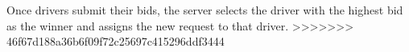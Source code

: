 \begin{algorithm}
\begin{algorithmic}[1]
Once drivers submit their bids, the server selects the driver with the highest bid as the winner and assigns the new request to that driver.
>>>>>>> 46f67d188a36b6f09f72c25697c415296ddf3444







\end{algorithmic}
\end{algorithm}
